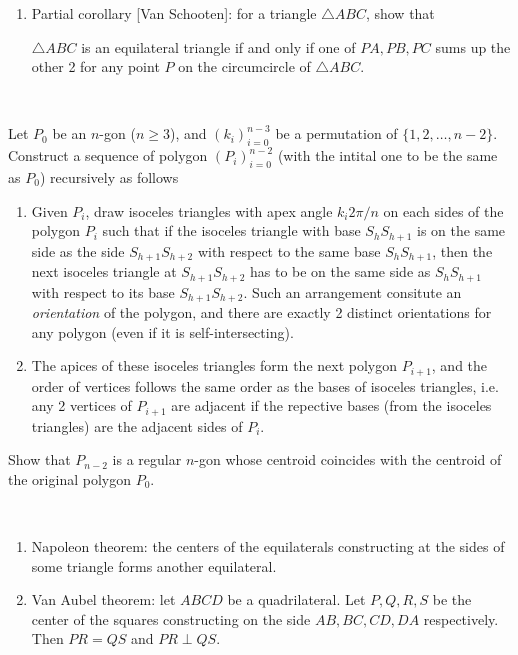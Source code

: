 \documentclass{treatise}
\begin{document}
\begin{shaded}
\begin{theorem}
\begin{enumerate}
	\item Partial corollary [Van Schooten]: for a triangle $\triangle ABC$, show that
	\begin{center}
		$\triangle ABC$ is an equilateral triangle if and only if one of $PA, PB, PC$ sums up the other 2 for any point $P$ on the circumcircle of $\triangle ABC$.
	\end{center}
\end{enumerate}
\end{theorem}
\ \\
\begin{theorem}
Let $P_0$ be an $n$-gon ($n \geq 3$), and $(k_i)_{i = 0}^{n - 3}$ be a permutation of $\{ 1, 2, \hdots, n - 2 \}$. Construct a sequence of polygon $(P_i)_{i = 0}^{n - 2}$ (with the intital one to be the same as $P_0$) recursively as follows
\begin{enumerate}
	\item Given $P_i$, draw isoceles triangles with apex angle $k_i 2 \pi/n$ on each sides of the polygon $P_i$ such that if the isoceles triangle with base $S_h S_{h + 1}$ is on the same side as the side $S_{h + 1} S_{h + 2}$ with respect to the same base $S_h S_{h + 1}$, then the next isoceles triangle at $S_{h + 1} S_{h + 2}$ has to be on the same side as $S_h S_{h + 1}$ with respect to its base $S_{h + 1} S_{h + 2}$. Such an arrangement consitute an \emph{orientation} of the polygon, and there are exactly 2 distinct orientations for any polygon (even if it is self-intersecting).
	\item The apices of these isoceles triangles form the next polygon $P_{i + 1}$, and the order of vertices follows the same order as the bases of isoceles triangles, i.e. any 2 vertices of $P_{i + 1}$ are adjacent if the repective bases (from the isoceles triangles) are the adjacent sides of $P_i$.
\end{enumerate}
Show that $P_{n - 2}$ is a regular $n$-gon whose centroid coincides with the centroid of the original polygon $P_0$.
\end{theorem}
\begin{corollary} \ 
\begin{enumerate}
	\item Napoleon theorem: the centers of the equilaterals constructing at the sides of some triangle forms another equilateral.
	\item Van Aubel theorem: let $ABCD$ be a quadrilateral. Let $P, Q, R, S$ be the center of the squares constructing on the side $AB, BC, CD, DA$ respectively. Then $PR = QS$ and $PR \perp QS$.

\end{enumerate}
\end{corollary}
\end{shaded}
\end{document}
